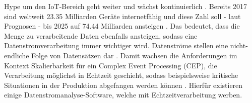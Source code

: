  Hype um den IoT-Bereich geht weiter und wächst kontinuierlich \cite{peter.2015}. Bereits 2017 sind weltweit 23.35 Milliarden Geräte internetfähig und diese Zahl soll - laut Prognosen - bis 2025 auf 74.44 Milliarden ansteigen \cite{Statista.2017}. Das bedeutet, dass die Menge zu verarbeitende Daten ebenfalls ansteigen, sodass eine Datenstromverarbeitung immer wichtiger wird. Datenströme stellen eine nicht-endliche Folge von Datensätzen dar \cite{Mock.2005}. Damit wachsen die Anforderungen im Kontext Skalierbarkeit für ein Complex Event Processing (CEP), die Verarbeitung möglichst in Echtzeit geschieht, sodass beispielsweise kritische Situationen in der Produktion abgefangen werden können \cite{rcrwireless.2016}. Hierfür existieren  einige Datenstromanalyse-Software, welche mit Echtzeitverarbeitung werben.
